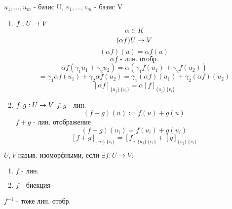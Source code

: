 \documentclass[algebra]{subfiles}
\begin{document}
    \begin{properties}
        $u_1,...,u_m$ - базис U, $v_1,...,v_m$ - базис V
        \begin{enumerate}
          \item $f: U \rightarrow V$
          \[\alpha \in K\]
          \[(\alpha f) U \rightarrow V\]
          \[(\alpha f)(u) = \alpha f(u)\]
          \[\alpha f \text{ - лин. отобр.}\]
          \[\alpha f(\gamma_1 u_1 + \gamma_2 u_2) = \alpha (\gamma_1 f(u_1) + \gamma_2 f(u_2))\]
          \[= \gamma_1 \alpha f(u_1) + \gamma_2 \alpha f(u_2) = \gamma_1 (\alpha f) (u_1) + \gamma_2 (\alpha f) (u_2)\]
          \[[\alpha f]_{\{u_j\}\ \{v_i\}} = \alpha[f]_{\{u_j\}\ \{v_i\}}\]
          \item $f,g: U \rightarrow V$ $f,g$ - лин.
          \[(f+g)(u) := f(u) + g(u)\]
          $f+g$ - лин. отображение
          \[(f+g)(u_i) = f(u_i) + g(u_i)\]
          \[[f + g]_{\{u_j\}\ \{v_i\}} = [f]_{\{u_j\}\ \{v_i\}} + [g]_{\{u_j\}\ \{v_i\}}\]
        \end{enumerate}
    \end{properties}

    \begin{definition}
        $U,V \text{ назыв. изоморфными, если } \exists f: U \to V:$
        \begin{enumerate}
            \item $f \text{ - лин.}$
            \item $f \text{ - биекция}$
        \end{enumerate}
    \end{definition}

    \begin{upr}
        $f^{-1}$ - тоже лин. отобр.
    \end{upr}
\end{document}
